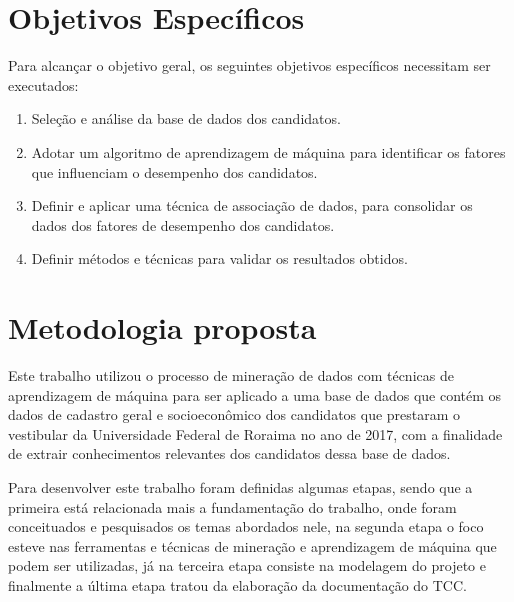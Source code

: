 \section{Objetivos Específicos}

Para alcançar o objetivo geral, os seguintes objetivos específicos necessitam ser executados:


\begin{enumerate}
  \item Seleção e análise da base de dados dos candidatos.
  \item Adotar um algoritmo de aprendizagem de máquina para identificar os fatores que influenciam o desempenho dos candidatos.
  \item Definir e aplicar uma técnica de associação de dados, para consolidar os dados dos fatores de desempenho dos candidatos.
  \item Definir métodos e técnicas para validar os resultados obtidos.
\end{enumerate}

\section{Metodologia proposta}

Este trabalho utilizou o processo de mineração de dados com técnicas de aprendizagem de máquina para ser aplicado a uma base de dados que contém os dados de cadastro geral e socioeconômico dos candidatos que prestaram o vestibular da Universidade Federal de Roraima no ano de 2017, com a finalidade de extrair conhecimentos relevantes dos candidatos dessa base de dados.

Para desenvolver este trabalho foram definidas algumas etapas, sendo que a primeira está relacionada mais a fundamentação do trabalho, onde foram conceituados e pesquisados os temas abordados nele, na segunda etapa o foco esteve nas ferramentas e técnicas de mineração e aprendizagem de máquina que podem ser utilizadas, já na terceira etapa consiste na modelagem do projeto e finalmente a última etapa tratou da elaboração da documentação do TCC.




